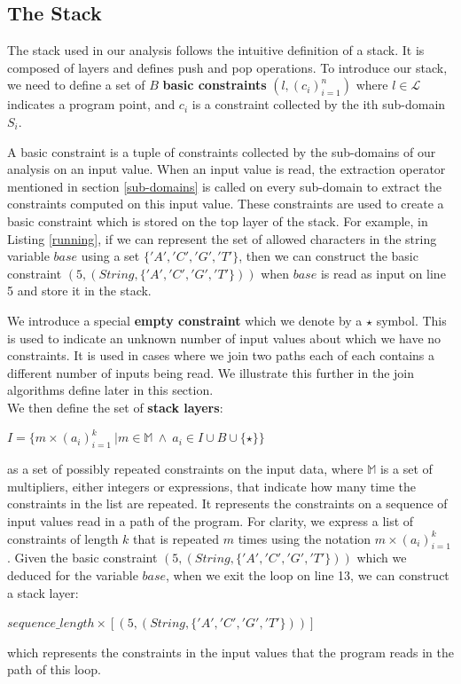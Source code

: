 \documentclass[10pt]{report}
\begin{document}
\subsection{The Stack} \label{stack}

The stack used in our analysis follows the intuitive definition of a stack. It is composed of layers and defines push and pop operations. To introduce our stack, we need to define a set of $ B $ \textbf{basic constraints} $ (l, (c_{i})_{i=1}^{n}) $ where $ l \in \mathcal{L} $ indicates a program point, and $ c_{i} $ is a constraint collected by the ith sub-domain $ S_{i} $. 

A basic constraint is a tuple of constraints collected by the sub-domains of our analysis on an input value. When an input value is read, the extraction operator mentioned in section \ref{sub-domains} is called on every sub-domain to extract the constraints computed on this input value. These constraints are used to create a basic constraint which is stored on the top layer of the stack. For example, in Listing \ref{running}, if we can represent the set of allowed characters in the string variable $ base $ using a set $ \lbrace 'A', 'C', 'G', 'T' \rbrace $, then we can construct the basic constraint $ (5, (String, \lbrace 'A', 'C', 'G', 'T' \rbrace)) $ when $ base $ is read as input on line 5 and store it in the stack. 

We introduce a special \textbf{empty constraint} which we denote by a $ \star $ symbol. This is used to indicate an unknown number of input values about which we have no constraints. It is used in cases where we join two paths each of each contains a different number of inputs being read. We illustrate this further in the join algorithms define later in this section. \\

We then define the set of \textbf{stack layers}: 
\begin{center}
$I  = \lbrace  m \times (a_{i})_{i=1}^{k}\ \vert m \in \mathbb{M}\ \wedge \ a_{i} \in I \cup B \cup \lbrace \star \rbrace \rbrace$
\end{center}
as a set of possibly repeated constraints on the input data, where $ \mathbb{M} $ is a set of multipliers, either integers or expressions, that indicate how many time the constraints in the list are repeated. It represents the constraints on a sequence of input values read in a path of the program. For clarity, we express a list of constraints of length $ k $ that is repeated $ m $ times using the notation $ m \times (a_{i})_{i=1}^{k} $. Given the basic constraint $ (5, (String, \lbrace 'A', 'C', 'G', 'T' \rbrace))$ which we deduced for the variable $ base $, when we exit the loop on line 13, we can construct a stack layer:
\begin{center}
 $ sequence\_length \times [(5, (String, \lbrace 'A', 'C', 'G', 'T' \rbrace))] $  \\
\end{center}
which represents the constraints in the input values that the program reads in the path of this loop. 
\end{document}
